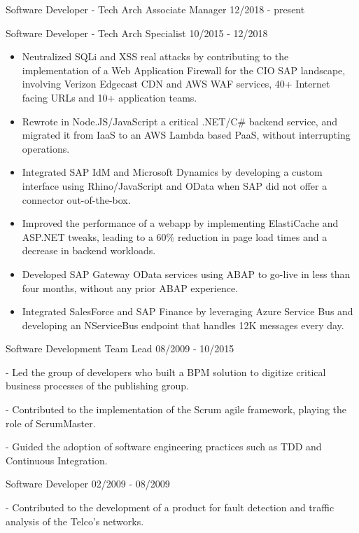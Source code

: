 \documentclass[11pt]{article} %
\begin{document}
\begin{description}
\squish
{}
           {Software Developer - Tech Arch Associate Manager}
           {12/2018 - present}

           {Software Developer - Tech Arch Specialist}
           {10/2015 - 12/2018}

\begin{itemize}
\item Neutralized SQLi and XSS real attacks by contributing to the implementation of a Web Application Firewall for the CIO SAP landscape, involving Verizon Edgecast CDN and AWS WAF services, 40+ Internet facing URLs and 10+ application teams.
\item Rewrote in Node.JS/JavaScript a critical .NET/C\# backend service, and migrated it from IaaS to an AWS Lambda based PaaS, without interrupting operations.
\item Integrated SAP IdM and Microsoft Dynamics by developing a custom interface using Rhino/JavaScript and OData when SAP did not offer a connector out-of-the-box.
\item Improved the performance of a webapp by implementing ElastiCache and ASP.NET tweaks, leading to a 60\% reduction in page load times and a decrease in backend workloads.
\item Developed SAP Gateway OData services using ABAP to go-live in less than four months, without any prior ABAP experience.
\item Integrated SalesForce and SAP Finance by leveraging Azure Service Bus and developing an NServiceBus endpoint that handles 12K messages every day.
\end{itemize}

           {Software Development Team Lead}
           {08/2009 - 10/2015}

- Led the group of developers who built a BPM solution to digitize critical business processes of the publishing group.

- Contributed to the implementation of the Scrum agile framework, playing the role of ScrumMaster.

- Guided the adoption of software engineering practices such as TDD and Continuous Integration.

           {Software Developer}
           {02/2009 - 08/2009}

- Contributed to the development of a product for fault detection and traffic analysis of the Telco's networks.

\end{description}
\end{document}

